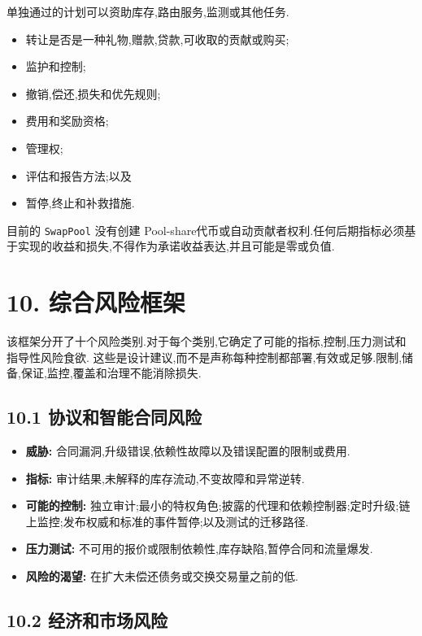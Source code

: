 \documentclass[11pt]{article}
\begin{document}
单独通过的计划可以资助库存,路由服务,监测或其他任务.

\begin{itemize}[leftmargin=*]
\item 转让是否是一种礼物,赠款,贷款,可收取的贡献或购买;
\item 监护和控制;
\item 撤销,偿还,损失和优先规则;
\item 费用和奖励资格;
\item 管理权;
\item 评估和报告方法;以及
\item 暂停,终止和补救措施.
\end{itemize}
目前的 \texttt{SwapPool} 没有创建 Pool-share代币或自动贡献者权利.任何后期指标必须基于实现的收益和损失,不得作为承诺收益表达,并且可能是零或负值.


\section*{10. 综合风险框架}

该框架分开了十个风险类别.对于每个类别,它确定了可能的指标,控制,压力测试和指导性风险食欲. 这些是设计建议,而不是声称每种控制都部署,有效或足够.限制,储备,保证,监控,覆盖和治理不能消除损失.

\subsection*{10.1 协议和智能合同风险}

\begin{itemize}[leftmargin=*]
\item \textbf{威胁:} 合同漏洞,升级错误,依赖性故障以及错误配置的限制或费用.
\item \textbf{指标:} 审计结果,未解释的库存流动,不变故障和异常逆转.
\item \textbf{可能的控制:} 独立审计;最小的特权角色;披露的代理和依赖控制器;定时升级;链上监控;发布权威和标准的事件暂停;以及测试的迁移路径.
\item \textbf{压力测试:} 不可用的报价或限制依赖性,库存缺陷,暂停合同和流量爆发.
\item \textbf{风险的渴望:} 在扩大未偿还债务或交换交易量之前的低.
\end{itemize}
\subsection*{10.2 经济和市场风险}
\end{document}
